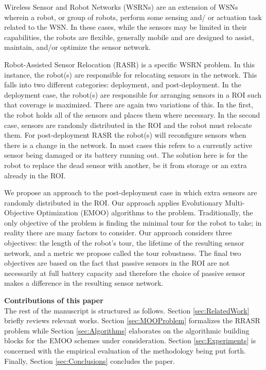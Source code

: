\documentclass[conference]{IEEEtran}
\begin{document}
Wireless Sensor and Robot Networks (WSRNs) are an extension of WSNs wherein a robot, or group of robots, perform some sensing and/ or actuation task related to the WSN. In these cases, while the sensors may be limited in their capabilities, the robots are flexible, generally mobile and are designed to assist, maintain, and/or optimize the sensor network. 

Robot-Assisted Sensor Relocation (RASR) is a specific WSRN problem. In this instance, the robot(s) are responsible for relocating sensors in the network. This falls into two different categories: deployment, and post-deployment. In the deployment case, the robot(s) are responsible for arranging sensors in a ROI such that coverage is maximized. There are again two variations of this. In the first, the robot holds all of the sensors and places them where necessary. In the second case, sensors are randomly distributed in the ROI and the robot must relocate them. For post-deployment RASR the robot(s) will reconfigure sensors when there is a change in the network. In most cases this refers to a currently active sensor being damaged or its battery running out. The solution here is for the robot to replace the dead sensor with another, be it from storage or an extra already in the ROI.

We propose an approach to the post-deployment case in which extra sensors are randomly distributed in the ROI. Our approach applies Evolutionary Multi-Objective Optimization (EMOO) algorithms  to the problem. Traditionally, the only objective of the problem is finding the minimal tour for the robot to take; in reality there are many factors to consider. Our approach considers three objectives: the length of the robot's tour, the lifetime of the resulting sensor network, and a metric we propose called the tour robustness. The final two objectives are based on the fact that passive sensors in the ROI are not necessarily at full battery capacity and therefore the choice of passive sensor makes a difference in the resulting sensor network.

\textbf{Contributions of this paper} \\

The rest of the manuscript is structured as follows. Section \ref{sec:RelatedWork} briefly reviews relevant works. Section \ref{sec:MOOProblem} formalizes the RRASR problem while Section \ref{sec:Algorithms} elaborates on the algorithmic building blocks for the EMOO schemes under consideration. Section \ref{sec:Experiments} is concerned with the empirical evaluation of the methodology being put forth. Finally, Section \ref{sec:Conclusions} concludes the paper.
\end{document}
